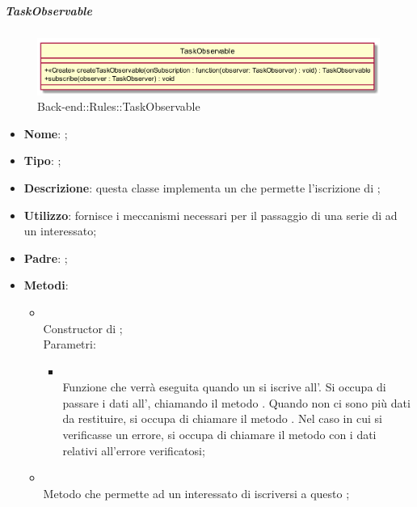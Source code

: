 \hypertarget{TaskObservable_label}{\subparagraph{TaskObservable}}
\begin{figure}[h]
	\centering
	\includegraphics[width=\textwidth,height=\textheight,keepaspectratio]{images/ClassTaskObservable.png}
	\caption{Back-end::Rules::TaskObservable}
\end{figure}
\begin{itemize}
	\item \textbf{Nome}: ;
	\item \textbf{Tipo}: ;
	\item \textbf{Descrizione}: questa classe implementa un  che permette l'iscrizione di ;
	\item \textbf{Utilizzo}: fornisce i meccanismi necessari per il passaggio di una serie di  ad un  interessato;
	\item \textbf{Padre}: ;
	\item \textbf{Metodi}:
	\begin{itemize}
		\item[]  \\		Constructor di ;\\
		Parametri:
		\begin{itemize}
			\item {} \\
			Funzione che verrà eseguita quando un  si iscrive all'. Si occupa di passare i dati all', chiamando il metodo . Quando non ci sono più dati da restituire, si occupa di chiamare il metodo . Nel caso in cui si verificasse un errore, si occupa di chiamare il metodo  con i dati relativi all'errore verificatosi;
		\end{itemize}
		\item[]  \\		Metodo che permette ad un  interessato di iscriversi a questo ;\\

\end{itemize}
\end{itemize}
